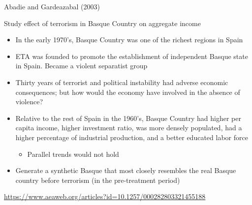 \documentclass[compress, 8pt]{beamer}
\begin{document}
\begin{frame}{Abadie and Gardeazabal (2003)}


Study effect of terrorism in Basque Country on aggregate income
% 
\begin{itemize}
    \item In the early 1970's, Basque Country was one of the richest regions in Spain
    \item ETA was founded to promote the establishment of independent Basque state in Spain. Became a violent separatist group
    \item Thirty years of terrorist and political instability had adverse economic consequences; but how would the economy have involved in the absence of violence?

    \item Relative to the rest of Spain in the 1960's, Basque Country had higher per capita income, higher investment ratio, was more densely populated, had a higher percentage of industrial production, and a better educated labor force
    \begin{itemize}
        \item [$\implies$] Parallel trends would not hold
    \end{itemize}

    \item Generate a synthetic Basque that most closely resembles the real Basque country before terrorism (in the pre-treatment period)
\end{itemize}

\url{https://www.aeaweb.org/articles?id=10.1257/000282803321455188}

\end{frame}
\end{document}
